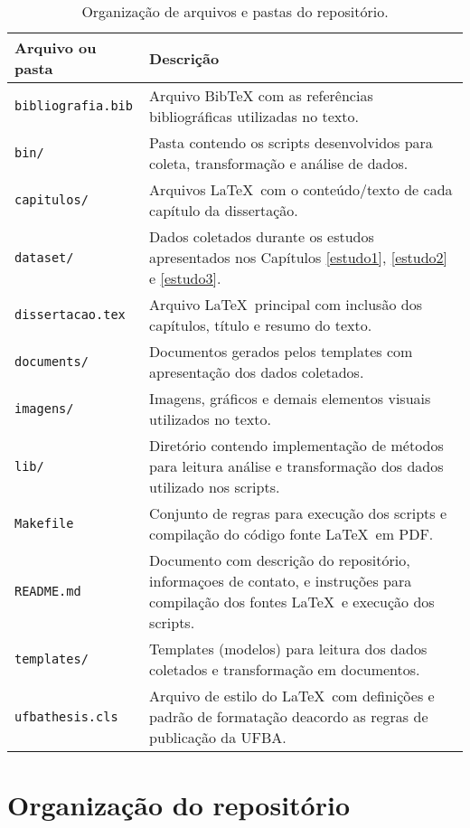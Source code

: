 \begin{table}[ht]
\caption{Organização de arquivos e pastas do repositório.}
\centering
\begin{tabular}{ l p{10cm} }
  \hline
  Arquivo ou pasta            & Descrição           \\
  \hline
  \texttt{bibliografia.bib}   & Arquivo BibTeX com as referências bibliográficas utilizadas no texto. \\
  \texttt{bin/}               & Pasta contendo os scripts desenvolvidos para coleta, transformação e análise de dados. \\
  \texttt{capitulos/}         & Arquivos \LaTeX \ com o conteúdo/texto de cada capítulo da dissertação. \\
  \texttt{dataset/}           & Dados coletados durante os estudos apresentados nos Capítulos \ref{estudo1}, \ref{estudo2} e \ref{estudo3}. \\
  \texttt{dissertacao.tex}    & Arquivo \LaTeX \ principal com inclusão dos capítulos, título e resumo do texto. \\
  \texttt{documents/}         & Documentos gerados pelos templates com apresentação dos dados coletados. \\
  \texttt{imagens/}           & Imagens, gráficos e demais elementos visuais utilizados no texto. \\
  \texttt{lib/}               & Diretório contendo implementação de métodos para leitura análise e transformação dos dados utilizado nos scripts. \\
  \texttt{Makefile}           & Conjunto de regras para execução dos scripts e compilação do código fonte \LaTeX \ em PDF.                 \\
  \texttt{README.md}          & Documento com descrição do repositório, informaçoes de contato, e instruções para compilação dos fontes \LaTeX \ e execução dos scripts. \\
  \texttt{templates/}         & Templates (modelos) para leitura dos dados coletados e transformação em documentos. \\
  \texttt{ufbathesis.cls}     & Arquivo de estilo do \LaTeX \ com definições e padrão de formatação deacordo as regras de publicação da UFBA. \\
  \hline
\end{tabular}
\label{arquivos-repositorio}
\end{table}

\section{Organização do repositório}

